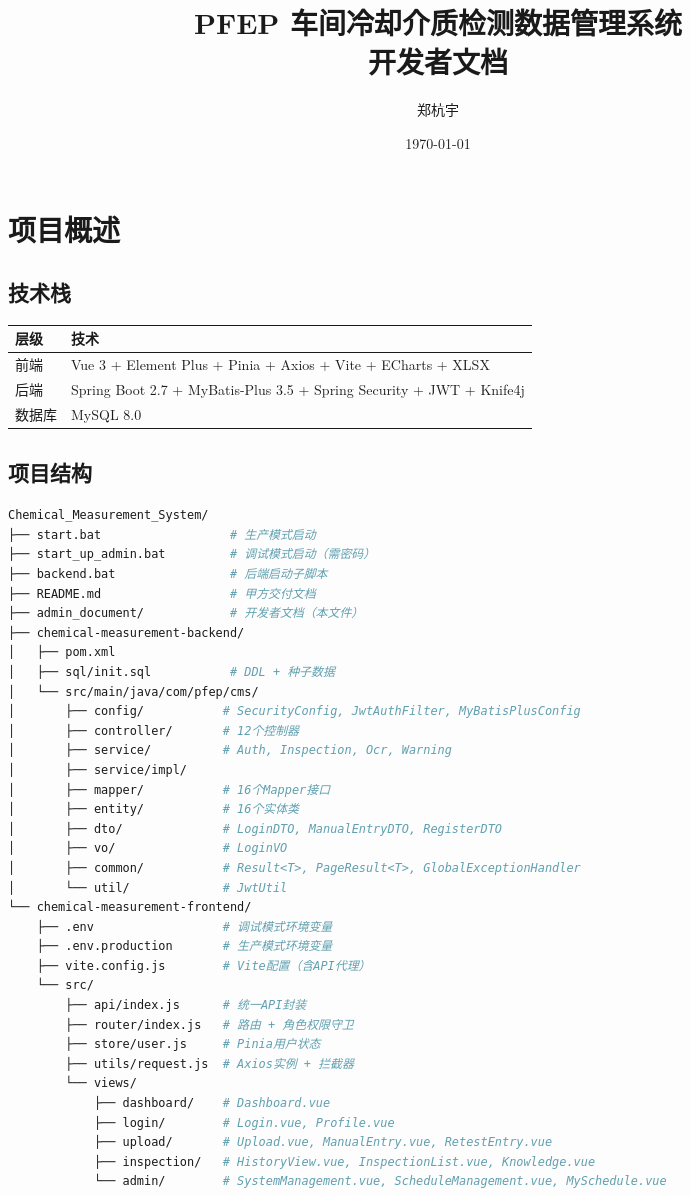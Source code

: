 \documentclass[12pt,a4paper]{ctexart}
\title{PFEP 车间冷却介质检测数据管理系统\\开发者文档}
\author{郑杭宇}
\date{\today}
\begin{document}
\maketitle
\tableofcontents
\newpage

\section{项目概述}

\subsection{技术栈}

\begin{tabular}{|l|l|}
\hline
\textbf{层级} & \textbf{技术} \\
\hline
前端 & Vue 3 + Element Plus + Pinia + Axios + Vite + ECharts + XLSX \\
后端 & Spring Boot 2.7 + MyBatis-Plus 3.5 + Spring Security + JWT + Knife4j \\
数据库 & MySQL 8.0 \\
\hline
\end{tabular}

\subsection{项目结构}

\begin{lstlisting}[language=bash]
Chemical_Measurement_System/
├── start.bat                  # 生产模式启动
├── start_up_admin.bat         # 调试模式启动（需密码）
├── backend.bat                # 后端启动子脚本
├── README.md                  # 甲方交付文档
├── admin_document/            # 开发者文档（本文件）
├── chemical-measurement-backend/
│   ├── pom.xml
│   ├── sql/init.sql           # DDL + 种子数据
│   └── src/main/java/com/pfep/cms/
│       ├── config/           # SecurityConfig, JwtAuthFilter, MyBatisPlusConfig
│       ├── controller/       # 12个控制器
│       ├── service/          # Auth, Inspection, Ocr, Warning
│       ├── service/impl/
│       ├── mapper/           # 16个Mapper接口
│       ├── entity/           # 16个实体类
│       ├── dto/              # LoginDTO, ManualEntryDTO, RegisterDTO
│       ├── vo/               # LoginVO
│       ├── common/           # Result<T>, PageResult<T>, GlobalExceptionHandler
│       └── util/             # JwtUtil
└── chemical-measurement-frontend/
    ├── .env                  # 调试模式环境变量
    ├── .env.production       # 生产模式环境变量
    ├── vite.config.js        # Vite配置（含API代理）
    └── src/
        ├── api/index.js      # 统一API封装
        ├── router/index.js   # 路由 + 角色权限守卫
        ├── store/user.js     # Pinia用户状态
        ├── utils/request.js  # Axios实例 + 拦截器
        └── views/
            ├── dashboard/    # Dashboard.vue
            ├── login/        # Login.vue, Profile.vue
            ├── upload/       # Upload.vue, ManualEntry.vue, RetestEntry.vue
            ├── inspection/   # HistoryView.vue, InspectionList.vue, Knowledge.vue
            └── admin/        # SystemManagement.vue, ScheduleManagement.vue, MySchedule.vue
\end{lstlisting}
\end{document}
